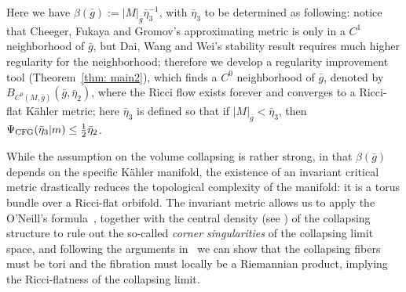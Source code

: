 \documentclass[pdftex]{sigma}
\numberwithin{equation}{section}
\begin{document}
Here we have $\beta(\bar{g}):=|M|_{\bar{g}}\bar{\eta}_3^{-1}$, with
$\bar{\eta}_3$ to be determined as following: notice that Cheeger, Fukaya and
Gromov's approximating metric is only in a $C^1$ neighborhood of $\bar{g}$, but
Dai, Wang and Wei's stability result requires much higher regularity for the
neighborhood; therefore we develop a regularity improvement tool
(Theorem~\ref{thm: main2}), which finds a $C^0$ neighborhood of $\bar{g}$,
denoted by $B_{C^0(M,\bar{g})}(\bar{g}, \bar{\eta}_2)$, where the Ricci flow
exists forever and converges to a Ricci-flat K\"ahler metric; here
$\bar{\eta}_3$ is defined so that if $|M|_{\bar{g}}<\bar{\eta}_3$, then
$\Psi_{\rm CFG}(\bar{\eta}_3|m)\le \frac{1}{2}\bar{\eta}_2$.

While the assumption on the volume collapsing is rather strong, in that
$\beta(\bar{g})$ depends on the specific K\"ahler manifold, the
existence of an invariant critical metric drastically reduces the topological
complexity of the manifold: it is a torus bundle over a Ricci-flat orbifold. The
invariant metric allows us to apply the O'Neill's formula~\cite{ONeill},
together with the central density (see \cite[Section~5]{Foxy1908}) of the collapsing
structure to rule out the so-called \emph{corner singularities} of the
collapsing limit space, and following the arguments in~\cite{Lott10, NT18}
we can show that the collapsing fibers must be tori and the fibration must
locally be a Riemannian product, implying the Ricci-flatness of the collapsing
limit.
\end{document}
